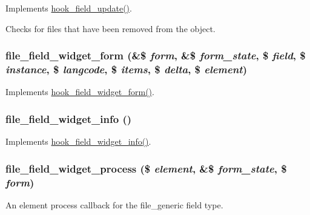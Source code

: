 \label{file_8field_8inc_a3666017c649e6c46c6582d871355da2d}
Implements \hyperlink{group__field__types_gaca5bc4f8ab69818f23783af24454d9c4}{hook\_\-field\_\-update()}.

Checks for files that have been removed from the object. \hypertarget{file_8field_8inc_a83f270ff3895b6a02c1c7cdcbffcd03f}{
\subsubsection[{file\_\-field\_\-widget\_\-form}]{\setlength{\rightskip}{0pt plus 5cm}file\_\-field\_\-widget\_\-form (\&\$ {\em form}, \/  \&\$ {\em form\_\-state}, \/  \$ {\em field}, \/  \$ {\em instance}, \/  \$ {\em langcode}, \/  \$ {\em items}, \/  \$ {\em delta}, \/  \$ {\em element})}}
\label{file_8field_8inc_a83f270ff3895b6a02c1c7cdcbffcd03f}
Implements \hyperlink{group__field__widget_gaa9b0e55fd0eb57ac0f9c7c30d251971b}{hook\_\-field\_\-widget\_\-form()}. \hypertarget{file_8field_8inc_a5857e6006412911abf7dbf3efd8d4c6d}{
\subsubsection[{file\_\-field\_\-widget\_\-info}]{\setlength{\rightskip}{0pt plus 5cm}file\_\-field\_\-widget\_\-info ()}}
\label{file_8field_8inc_a5857e6006412911abf7dbf3efd8d4c6d}
Implements \hyperlink{group__field__widget_gac53aa6c2a4ac1215660d25b5d7f20792}{hook\_\-field\_\-widget\_\-info()}. \hypertarget{file_8field_8inc_a6dbe1f9dbe76cd478f57ae60409307b2}{
\subsubsection[{file\_\-field\_\-widget\_\-process}]{\setlength{\rightskip}{0pt plus 5cm}file\_\-field\_\-widget\_\-process (\$ {\em element}, \/  \&\$ {\em form\_\-state}, \/  \$ {\em form})}}
\label{file_8field_8inc_a6dbe1f9dbe76cd478f57ae60409307b2}
An element process callback for the file\_\-generic field type.

